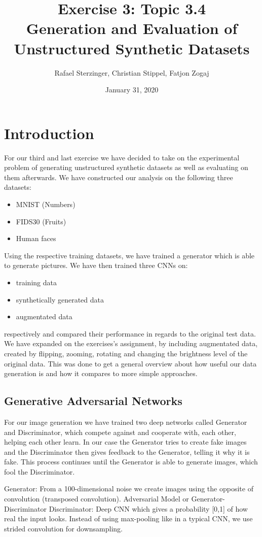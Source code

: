\documentclass{article}
\title{Exercise 3: Topic 3.4\\ Generation and Evaluation of Unstructured Synthetic Datasets}
\author{Rafael Sterzinger, Christian Stippel, Fatjon Zogaj}
\date{January 31, 2020}
\begin{document}
\maketitle

\section{Introduction}
For our third and last exercise we have decided to take on the experimental problem of generating unstructured synthetic datasets as well as evaluating on them afterwards.
We have constructed our analysis on the following three datasets:
\begin{itemize}
    \item MNIST (Numbers)
    \item FIDS30 (Fruits)
    \item Human faces
\end{itemize}
Using the respective training datasets, we have trained a generator which is able to generate pictures.
We have then trained three CNNs on:
\begin{itemize}
    \item training data
    \item synthetically generated data
    \item augmentated data
\end{itemize}
respectively and compared their performance in regards to the original test data. We have expanded on the exercises's assignment, by
including augmentated data, created by flipping, zooming, rotating and changing the brightness level of the original data.
This was done to get a general overview about how useful our data generation is and how it compares to more simple approaches.

\subsection{Generative Adversarial Networks}
For our image generation we have trained two deep networks called Generator and Discriminator, which compete against and cooperate with, each other,
helping each other learn. In our case the Generator tries to create fake images and the Discriminator then gives feedback to the Generator,
telling it why it is fake. This process continues until the Generator is able to generate images, which fool the Discriminator.
\newline

Generator: From a 100-dimensional noise we create images using the opposite of convolution (transposed convolution).
Adversarial Model or Generator-Discriminator
\newline
Discriminator: Deep CNN which gives a probability [0,1] of how real the input looks. Instead of using max-pooling like in a typical
CNN, we use strided convolution for downsampling.
\end{document}
